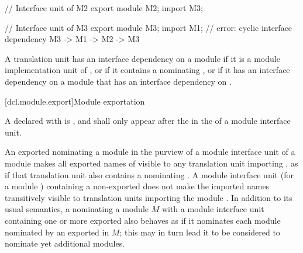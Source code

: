 \begin{std.txt}
\begin{example}
\begin{Program}
     // Interface unit of M2
     export module M2;
     import M3;

     // Interface unit of M3
     export module M3;
     import M1;         // error: cyclic interface dependency M3 -> M1 -> M2 -> M3
  \end{Program}
  \end{example}

\begin{before}\color{addclr}
\alinea
  A translation unit has an interface dependency on a module  if it is
  a module implementation unit of , or if it contains a
   nominating , or if it has
  an interface dependency on a module that has an interface dependency on .
\end{before}
\end{std.txt}

[dcl.module.export]{Module exportation}%

\begin{std.txt}\color{addclr}
  \resetalinea[0]
  \alinea
  \begin{after}\color{addclr}
  A  declared with  
  is , and shall only appear after the
   in the 
  of a module interface unit.
  \end{after}
  An exported
   nominating a module 
  in the purview of a module interface unit of a module  
  makes all exported names
  of  visible to any translation unit importing , as if
  that translation unit also contains a 
  nominating .
  \enternote
  A module interface unit (for a module ) containing a non-exported
     does not make the imported
    names transitively visible to translation units importing the module
    .
  \exitnote
  In addition to its usual semantics, a 
   nominating a module $M$ with 
  a module interface unit containing one or more exported
   also behaves as if
  it nominates each module nominated by an exported
   in $M$; this may in turn
  lead it to be considered to nominate yet additional modules.
\end{std.txt}


